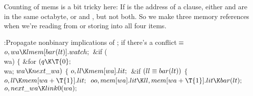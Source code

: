 Counting of mems is a bit tricky here: If  is the address of a clause,
either  and  are in
the same octabyte,
or  and , but not both. So we make three
memory
references when we're reading from or storing into all four items.

\Y\B\4:Propagate nonbinary implications of ;  if there's a conflict\X${}\equiv{}$\6
$\|o,\39\\{wa}\K\\{lmem}[\\{bar}(\\{lt})].\\{watch};{}$\6
\&{if} (\\{wa})\5
${}\{{}$\1\6
\&{for} ${}(\|q\K\T{0};{}$ \\{wa}; ${}\\{wa}\K\\{next\_wa}){}$\5
${}\{{}$\1\6
${}\|o,\39\\{ll}\K\\{mem}[\\{wa}].\\{lit};{}$\6
\&{if} ${}(\\{ll}\equiv\\{bar}(\\{lt})){}$\5
${}\{{}$\1\6
${}\|o,\39\\{ll}\K\\{mem}[\\{wa}+\T{1}].\\{lit};{}$\6
${}\\{oo},\39\\{mem}[\\{wa}].\\{lit}\K\\{ll},\39\\{mem}[\\{wa}+\T{1}].\\{lit}\K%
\\{bar}(\\{lt});{}$\6
${}\|o,\39\\{next\_wa}\K\\{link0}(\\{wa});{}$\6
